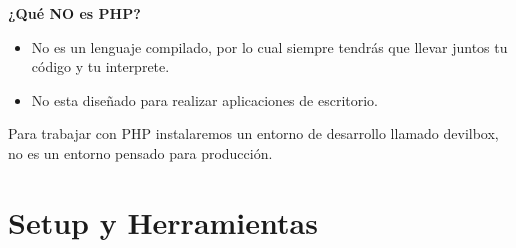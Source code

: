 \documentclass{article}
\begin{document}
\textbf{¿Qué NO es PHP?}
\begin{itemize}
  \item No es un lenguaje compilado, por lo cual siempre tendrás que llevar
    juntos tu código y tu interprete.
  \item No esta diseñado para realizar aplicaciones de escritorio.
\end{itemize}

Para trabajar con PHP instalaremos un entorno de desarrollo llamado devilbox, no
es un entorno pensado para producción.\\

\newpage

\section{Setup y Herramientas}%
%
%
%
%
%
%
%
%
%
%
%
\end{document}

